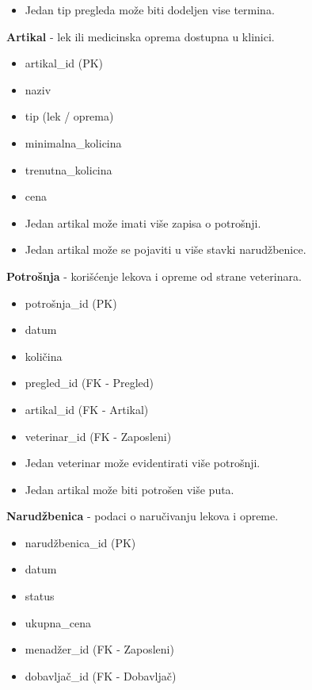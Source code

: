 \begin{itemize}{Veze:}
    \item Jedan tip pregleda može biti dodeljen vise termina. 
\end{itemize}

\indent\textbf{Artikal} - lek ili medicinska oprema dostupna u klinici.
\begin{itemize}{Atributi:}
    \item artikal\_id (PK)
    \item naziv
    \item tip (lek / oprema)
    \item minimalna\_kolicina
    \item trenutna\_kolicina
    \item cena
\end{itemize}

\begin{itemize}{Veze:}
    \item Jedan artikal može imati više zapisa o potrošnji.
    \item Jedan artikal može se pojaviti u više stavki narudžbenice.
\end{itemize}

\indent\textbf{Potrošnja} - korišćenje lekova i opreme od strane veterinara.
\begin{itemize}{Atributi:}
    \item potrošnja\_id (PK)
    \item datum
    \item količina
    \item pregled\_id (FK - Pregled)
    \item artikal\_id (FK - Artikal)
    \item veterinar\_id (FK - Zaposleni)
\end{itemize}

\begin{itemize}{Veze:}
    \item Jedan veterinar može evidentirati više potrošnji.
    \item Jedan artikal može biti potrošen više puta.
\end{itemize}

\indent\textbf{Narudžbenica} - podaci o naručivanju lekova i opreme.
\begin{itemize}{Atributi:}
    \item narudžbenica\_id (PK) 
    \item datum
    \item status
    \item ukupna\_cena
    \item menadžer\_id (FK - Zaposleni)
    \item dobavljač\_id (FK - Dobavljač)
\end{itemize}

